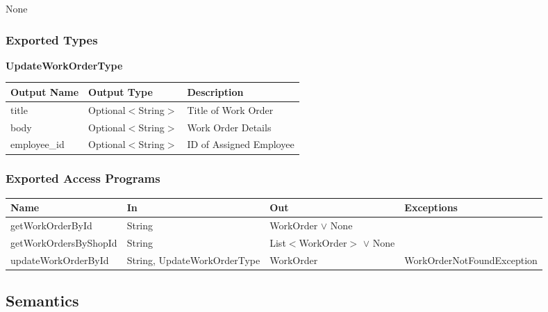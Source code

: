 \documentclass[12pt, titlepage]{article}
\begin{document}
None

\subsubsection{Exported Types}

\textbf{UpdateWorkOrderType}

\begin{table}[H]
	\begin{tabular}{|p{}|p{}|p{}|}
		\hline
		\textbf{Output Name} & \textbf{Output Type} & \textbf{Description}    \\
		\hline
		title                & Optional$<$String$>$ & Title of Work Order     \\
		\hline
		body                 & Optional$<$String$>$ & Work Order Details      \\
		\hline
		employee\_id         & Optional$<$String$>$ & ID of Assigned Employee \\
		\hline
	\end{tabular}
\end{table}

\subsubsection{Exported Access Programs}

\begin{center}
	\begin{adjustbox}{width=\textwidth}
		\begin{tabular}{llll}
			\hline
			\textbf{Name}         & \textbf{In}                 & \textbf{Out}                    & \textbf{Exceptions}        \\
			\hline
			getWorkOrderById      & String                      & WorkOrder $\lor$ None           & ~                          \\
			getWorkOrdersByShopId & String                      & List$<$WorkOrder$>$ $\lor$ None & ~                          \\
			updateWorkOrderById   & String, UpdateWorkOrderType & WorkOrder                       & WorkOrderNotFoundException \\
			\hline
		\end{tabular}
	\end{adjustbox}
\end{center}

\subsection{Semantics}
\end{document}
